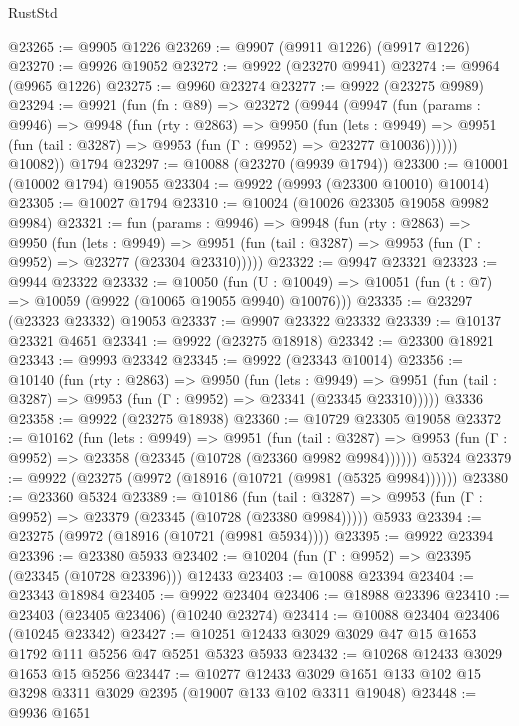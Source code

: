 \begin{lexlean}{RustStd}
\begin{coremodule}
@23265 := @9905 @1226
@23269 := @9907 (@9911 @1226) (@9917 @1226)
@23270 := @9926 @19052
@23272 := @9922 (@23270 @9941)
@23274 := @9964 (@9965 @1226)
@23275 := @9960 @23274
@23277 := @9922 (@23275 @9989)
@23294 := @9921
    (fun (fn : @89) =>
    @23272
      (@9944
        (@9947
          (fun (params : @9946) =>
          @9948
            (fun (rty : @2863) =>
            @9950
              (fun (lets : @9949) =>
              @9951 (fun (tail : @3287) => @9953 (fun (Γ : @9952) => @23277 @10036))))))
        @10082))
    @1794
@23297 := @10088 (@23270 (@9939 @1794))
@23300 := @10001 (@10002 @1794) @19055
@23304 := @9922 (@9993 (@23300 @10010) @10014)
@23305 := @10027 @1794
@23310 := @10024 (@10026 @23305 @19058 @9982 @9984)
@23321 := fun (params : @9946) =>
  @9948
    (fun (rty : @2863) =>
    @9950
      (fun (lets : @9949) =>
      @9951 (fun (tail : @3287) => @9953 (fun (Γ : @9952) => @23277 (@23304 @23310)))))
@23322 := @9947 @23321
@23323 := @9944 @23322
@23332 := @10050
    (fun (U : @10049) => @10051 (fun (t : @7) => @10059 (@9922 (@10065 @19055 @9940) @10076)))
@23335 := @23297 (@23323 @23332) @19053
@23337 := @9907 @23322 @23332
@23339 := @10137 @23321 @4651
@23341 := @9922 (@23275 @18918)
@23342 := @23300 @18921
@23343 := @9993 @23342
@23345 := @9922 (@23343 @10014)
@23356 := @10140
    (fun (rty : @2863) =>
    @9950
      (fun (lets : @9949) =>
      @9951 (fun (tail : @3287) => @9953 (fun (Γ : @9952) => @23341 (@23345 @23310)))))
    @3336
@23358 := @9922 (@23275 @18938)
@23360 := @10729 @23305 @19058
@23372 := @10162
    (fun (lets : @9949) =>
    @9951
      (fun (tail : @3287) =>
      @9953 (fun (Γ : @9952) => @23358 (@23345 (@10728 (@23360 @9982 @9984))))))
    @5324
@23379 := @9922 (@23275 (@9972 (@18916 (@10721 (@9981 (@5325 @9984))))))
@23380 := @23360 @5324
@23389 := @10186
    (fun (tail : @3287) => @9953 (fun (Γ : @9952) => @23379 (@23345 (@10728 (@23380 @9984)))))
    @5933
@23394 := @23275 (@9972 (@18916 (@10721 (@9981 @5934))))
@23395 := @9922 @23394
@23396 := @23380 @5933
@23402 := @10204 (fun (Γ : @9952) => @23395 (@23345 (@10728 @23396))) @12433
@23403 := @10088 @23394
@23404 := @23343 @18984
@23405 := @9922 @23404
@23406 := @18988 @23396
@23410 := @23403 (@23405 @23406) (@10240 @23274)
@23414 := @10088 @23404 @23406 (@10245 @23342)
@23427 := @10251 @12433 @3029 @3029 @47 @15 @1653 @1792 @111 @5256 @47 @5251 @5323 @5933
@23432 := @10268 @12433 @3029 @1653 @15 @5256
@23447 := @10277
    @12433
    @3029
    @1651
    @133
    @102
    @15
    @3298
    @3311
    @3029
    @2395
    (@19007 @133 @102 @3311 @19048)
@23448 := @9936 @1651

\end{coremodule}
\end{lexlean}
